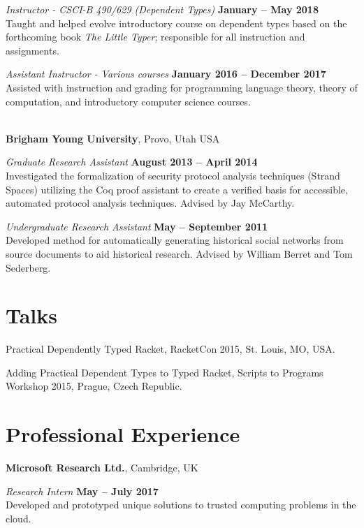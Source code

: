 \documentclass[margin,line]{res}
\begin{document}
\begin{resume}
{\em Instructor - CSCI-B 490/629 (Dependent Types)} \hfill {\bf January -- May 2018}
\\ Taught and helped evolve introductory course on dependent types based on the
forthcoming book \emph{The Little Typer}; responsible for all instruction and
assignments.

{\em Assistant Instructor - Various courses} \hfill {\bf January 2016 -- December
  2017}\\ Assisted with instruction and grading for programming language theory,
theory of computation, and introductory computer science courses.

\hfill \\

{\bf Brigham Young University}, Provo, Utah USA

\vspace{-.3cm}

{\em Graduate Research Assistant} \hfill {\bf August 2013 -- April
  2014}\\ Investigated the formalization of security protocol analysis
techniques (Strand Spaces) utilizing the Coq proof assistant to create
a verified basis for accessible, automated protocol analysis
techniques. Advised by Jay McCarthy.

{\em Undergraduate Research Assistant} \hfill {\bf May -- September
  2011}\\ Developed method for automatically generating historical
social networks from source documents to aid historical
research. Advised by William Berret and Tom Sederberg.

\section{\sc Talks}
Practical Dependently Typed Racket, RacketCon 2015, St. Louis, MO, USA.

Adding Practical Dependent Types to Typed Racket, Scripts to Programs Workshop 2015, Prague, Czech Republic.

\section{\sc Professional Experience}
{\bf Microsoft Research Ltd.}, Cambridge, UK

\vspace{-.3cm}
{\em Research Intern} \hfill {\bf May -- July 2017}\\
Developed and prototyped unique solutions to trusted computing problems in the cloud.



\end{resume}
\end{document}
